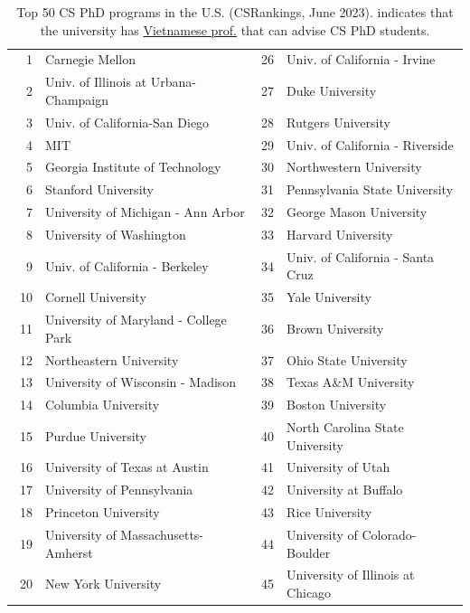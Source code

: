 \documentclass[11pt]{article}
\newcommand{\red}[1]{{\color{red}{#1}}}
\begin{document}
  \begin{table}
    \centering
    \small
    \caption{Top 50 CS PhD programs in the U.S. (CSRankings, June 2023). \red{$^*$} indicates that the university has \href{https://github.com/dynaroars/dynaroars.github.io/wiki/Viet-CS-Profs-US}{Vietnamese prof.} that can advise CS PhD students.}\label{tab:ranking}
  \begin{tabular}{rl|rl}
    \toprule
    1 & Carnegie Mellon & 26 & Univ. of California - Irvine \\
    2 & Univ. of Illinois at Urbana-Champaign\red{$^*$}  & 27 &  Duke University \\
    3 & Univ. of California-San Diego & 28 & Rutgers University\red{$^*$} \\
    4 & MIT & 29 & Univ. of California - Riverside\\
    5 & Georgia Institute of Technology         & 30 & Northwestern University\\
    6 & Stanford University& 31 & Pennsylvania State University  \\
    7 & University of Michigan - Ann Arbor\red{$^*$}   & 32& George Mason University\red{$^*$}\\  
    8 & University of Washington      &33 &  Harvard University \\
    9 &  Univ. of California - Berkeley  &34&  Univ. of California - Santa Cruz \\
    10 & Cornell University  & 35 &  Yale University \\
    11 & University of Maryland - College Park &  36& Brown University \\ 
    12 & Northeastern University\red{$^*$} &37&  Ohio State University\\
    13 & University of Wisconsin - Madison\red{$^*$}  &38& Texas A\&M University\red{$^*$} \\
    14 & Columbia University   &39 & Boston University  \\
    15 &   Purdue University  &40& North Carolina State University\\\  
    16 & University of Texas at Austin   &41 & University of Utah \\
    17 & University of Pennsylvania\red{$^*$} &42 & University at Buffalo\red{$^*$}\\
    18 & Princeton University  & 43& Rice University\\
    19 & University of Massachusetts-Amherst\red{$^*$} & 44&  University of Colorado-Boulder \\
    20 &  New York University  &45& University of Illinois at Chicago  \\

\end{tabular}
\end{table}
\end{document}
